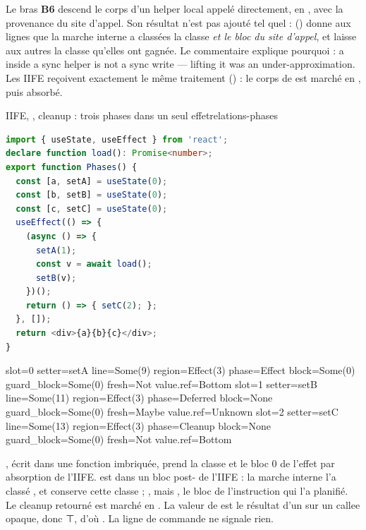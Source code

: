 Le bras \textbf{B6} descend le corps d'un helper local appelé directement, en , avec la provenance du site d'appel. Son résultat n'est pas ajouté tel quel :  () donne aux lignes que la marche interne a classées  la classe \emph{et le bloc du site d'appel}, et laisse aux autres la classe qu'elles ont gagnée. Le commentaire explique pourquoi : \og a  inside a sync helper is not a sync write --- lifting it was an under-approximation\fg{}. Les IIFE reçoivent exactement le même traitement () : le corps de  est marché en , puis absorbé.

\begin{exemple}{IIFE, , cleanup : trois phases dans un seul effet}{relations-phases}
\begin{lstlisting}[language=TypeScript,caption={\file{/tmp/verif07/e11.tsx}},label={lst:relations-phases}]
import { useState, useEffect } from 'react';
declare function load(): Promise<number>;
export function Phases() {
  const [a, setA] = useState(0);
  const [b, setB] = useState(0);
  const [c, setC] = useState(0);
  useEffect(() => {
    (async () => {
      setA(1);
      const v = await load();
      setB(v);
    })();
    return () => { setC(2); };
  }, []);
  return <div>{a}{b}{c}</div>;
}
\end{lstlisting}
\begin{sortie}
  slot=0 setter=setA line=Some(9)  region=Effect(3) phase=Effect   block=Some(0) guard_block=Some(0) fresh=Not   value.ref=Bottom
  slot=1 setter=setB line=Some(11) region=Effect(3) phase=Deferred block=None    guard_block=Some(0) fresh=Maybe value.ref=Unknown
  slot=2 setter=setC line=Some(13) region=Effect(3) phase=Cleanup  block=None    guard_block=Some(0) fresh=Not   value.ref=Bottom
\end{sortie}
, écrit dans une fonction imbriquée, prend la classe  et le bloc 0 de l'effet par absorption de l'IIFE.  est dans un bloc post- de l'IIFE : la marche interne l'a classé , et  conserve cette classe ; , mais , le bloc de l'instruction qui l'a planifié. Le cleanup retourné est marché en . La valeur de  est le résultat d'un  sur un callee opaque, donc ⊤, d'où . La ligne de commande ne signale rien.
\end{exemple}

